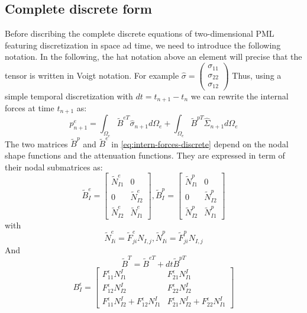 \subsection{Complete discrete form}
Before discribing the complete discrete equations of two-dimensional PML featuring discretization in space ad time, we need to introduce the following notation. In the following, the hat notation above an element will precise that the tensor is written in Voigt notation. For example $\hat{\sigma} = \begin{pmatrix}
\sigma_{11} \\
\sigma_{22} \\
\sigma_{12}
\end{pmatrix}$ 
Thus, using a simple temporal discretization with $dt=t_{n+1} - t_n$ we can rewrite the internal forces at time $t_{n+1}$ as:
\begin{equation}
p_{n+1}^e = \int_{\Omega_e} \tilde{B}^{eT} \hat{\sigma}_{n+1} d\Omega_e + \int_{\Omega_e}\tilde{B}^{pT} \hat{\Sigma}_{n+1} d\Omega_e
\label{eq:intern-forces-discrete}
\end{equation} 
The two matrices $\tilde{B}^{p}$ and $\tilde{B}^{e}$ in \ref{eq:intern-forces-discrete} depend on the nodal shape functions and the attenuation functions. They are expressed in term of their nodal submatrices as:
\begin{equation}
\tilde{B}^e_I = \begin{bmatrix}
\tilde{N}^e_{I1}&0\\0&\tilde{N}^e_{I2}\\\tilde{N}^e_{I2}&\tilde{N}^e_{I1}
\end{bmatrix}, \tilde{B}^p_I = \begin{bmatrix}
\tilde{N}^p_{I1}&0\\0&\tilde{N}^p_{I2}\\\tilde{N}^p_{I2}&\tilde{N}^p_{I1}
\end{bmatrix}
\end{equation} 
with 
\begin{equation}
\tilde{N}^e_{Ii} = \tilde{F}^e_{ji}N_{I,j}, \tilde{N}^p_{Ii} = \tilde{F}^p_{ji}N_{I,j}
\end{equation}
And
\begin{equation}
\tilde{B}^T = \tilde{B}^{eT}+dt \tilde{B}^{pT}
\end{equation}
\begin{equation}
B^\epsilon_I = \begin{bmatrix}
F^\epsilon_{11}N^I_{I1}&F^\epsilon_{21}N^I_{I1}\\
F^\epsilon_{12}N^I_{I2}&F^\epsilon_{22}N^I_{I2}\\
F^\epsilon_{11}N^I_{I2}+F^\epsilon_{12}N^I_{I1}& F^\epsilon_{21}N^I_{I2}+F^\epsilon_{22}N^I_{I1}
\end{bmatrix}
\end{equation}

